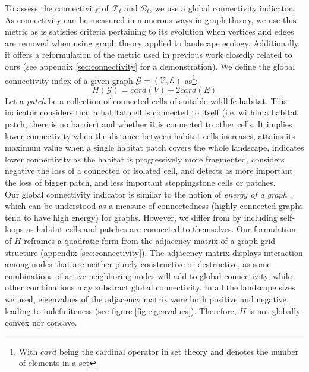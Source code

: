To assess the connectivity of $\mathcal{F}_t$ and $\mathcal{B}_t$, we use a global connectivity indicator. As connectivity can be measured in numerous ways in graph theory, we use this metric as is satisfies criteria pertaining to its evolution when vertices and edges are removed \citep{pascual-hortal_comparison_2006} when using graph theory applied to landscape ecology. Additionally, it offers a reformulation of the metric used in previous work closedly related to ours \citep{minas_spatial_2014, rachmawati_optimisation_2016} (see appendix \ref{sec:connectivity} for a demonstration). We define the global connectivity index of a given graph $\mathcal{G} = (\mathcal{V}, \mathcal{E})$ as\footnote{With $card$ being the cardinal operator in set theory and denotes the number of elements in a set}:
\begin{equation}
H(\mathcal{G}) = card(V) + 2card(E)
\label{eq:high_connectivity}
\end{equation} 
Let a \textit{patch} be a collection of connected cells of suitable wildlife habitat.
This indicator considers that a habitat cell is connected to itself (i.e, within a habitat patch, there is no barrier) and whether it is connected to other cells.  
It implies lower connectivity when the distance between habitat cells increases, attains its maximum value when a single habitat patch covers the whole landscape, indicates lower connectivity as the habitat is progressively more fragmented, considers negative the loss of a connected or isolated cell, and detects as more important the loss of bigger patch, and less important steppingstone cells or patches. 
\\
Our global connectivity indicator is similar to the notion of \textit{energy of a graph} \citep{gutman_energy_2001}, which can be understood as a measure of connectedness (highly connected graphs tend to have high energy) for graphs. However, we differ from \cite{gutman_energy_2001} by including self-loops as habitat cells and patches are connected to themselves. Our formulation of $H$ reframes a quadratic form from the adjacency matrix of a graph grid structure (appendix \ref{sec:connectivity}). The adjacency matrix displays interaction among nodes that are neither purely constructive or destructive, as some combinations of active neighboring nodes will add to global connectivity, while other combinations may substract global connectivity. In all the landscape sizes we used, eigenvalues of the adjacency matrix were both positive and negative, leading to indefiniteness (see figure \ref{fig:eigenvalues}). Therefore, $H$ is not globally convex nor concave. 
